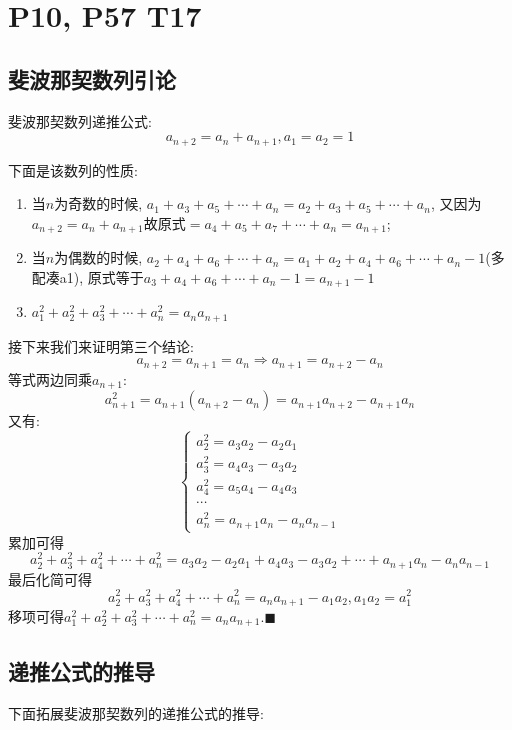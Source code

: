 \documentclass{book}
\begin{document}
    \section{\textcolor[rgb]{0.11,0.65,0.52}{P10, P57 T17}}
    \subsection{斐波那契数列引论}
    \textcolor[rgb]{0.38,0.11,0.2}{斐波那契数列}递推公式:$$a_{n+2}=a_n+a_{n+1},a_1=a_2=1$$

    下面是该数列的性质:

    \begin{enumerate}
        \item 当$n$为奇数的时候, $a_1+a_3+a_5+\cdots+a_n=a_2+a_3+a_5+\cdots+a_n$, 又因为$a_{n+2}=a_n+a_{n+1}$故原式$=a_4+a_5+a_7+\cdots+a_n=a_{n+1}$;
        \item 当$n$为偶数的时候, $a_2+a_4+a_6+\cdots+a_n=a_1+a_2+a_4+a_6+\cdots+a_n-1$(多配凑a1), 原式等于$a_3+a_4+a_6+\cdots+a_n-1=a_{n+1}-1$
        \item $\displaystyle a_1^2+a_2^2+a_3^2+\cdots+a_n^2=a_na_{n+1}$
    \end{enumerate}

    接下来我们来证明第三个结论:
    $$a_{n+2}=a_{n+1}=a_n\Longrightarrow a_{n+1}=a_{n+2}-a_n$$
    等式两边同乘$a_{n+1}$:$$a_{n+1}^2=a_{n+1}\left( a_{n+2}-a_n \right)=a_{n+1}a_{n+2}-a_{n+1}a_n$$
    又有:$$\left\{\begin{matrix}
            a_2^2=a_3a_2-a_2a_1 \\
            a_3^2=a_4a_3-a_3a_2 \\
            a_4^2=a_5a_4-a_4a_3 \\
            \cdots              \\
            a_n^2=a_{n+1}a_n-a_{n}a_{n-1}
        \end{matrix}\right. $$
    累加可得$$a_2^2+a_3^2+a_4^2+\cdots+a_n^2=a_3a_2-a_2a_1+a_4a_3-a_3a_2+\cdots+a_{n+1}a_n-a_{n}a_{n-1}$$
    最后化简可得$$a_2^2+a_3^2+a_4^2+\cdots+a_n^2=a_na_{n+1}-a_1a_2,a_1a_2=a_1^2$$
    移项可得$\displaystyle a_1^2+a_2^2+a_3^2+\cdots+a_n^2=a_na_{n+1}. \blacksquare$

    \subsection{递推公式的推导}
    下面拓展斐波那契数列的递推公式的推导:
\end{document}
